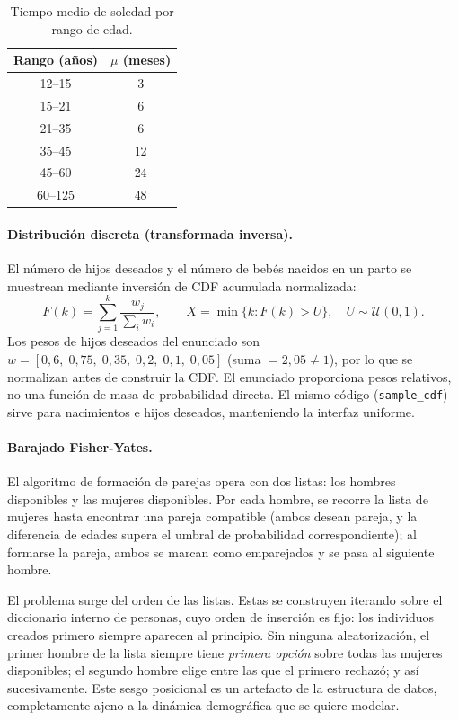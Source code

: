 \documentclass{llncs}
\begin{document}
\begin{table}[H]
\caption{Tiempo medio de soledad por rango de edad.}
\label{tab:soledad}
\centering
\begin{tabular}{cc}
\toprule
\textbf{Rango (años)} & \textbf{$\mu$ (meses)} \\
\midrule
12--15  & 3  \\
15--21  & 6  \\
21--35  & 6  \\
35--45  & 12 \\
45--60  & 24 \\
60--125 & 48 \\
\bottomrule
\end{tabular}
\end{table}

\paragraph{Distribución discreta (transformada inversa).}
El número de hijos deseados y el número de bebés nacidos en un parto se
muestrean mediante inversión de CDF acumulada normalizada:
\[
  F(k) = \sum_{j=1}^{k} \frac{w_j}{\sum_i w_i}, \qquad
  X = \min\bigl\{k : F(k) > U\bigr\}, \quad U \sim \mathcal{U}(0,1).
\]
Los pesos de hijos deseados del enunciado son
$w = [0{,}6,\; 0{,}75,\; 0{,}35,\; 0{,}2,\; 0{,}1,\; 0{,}05]$
(suma $= 2{,}05 \neq 1$), por lo que se normalizan antes de construir la
CDF\@.
El enunciado proporciona pesos relativos, no una función de masa de
probabilidad directa.
El mismo código (\texttt{sample\_cdf}) sirve para nacimientos e hijos
deseados, manteniendo la interfaz uniforme.

\paragraph{Barajado Fisher-Yates.}
El algoritmo de formación de parejas opera con dos listas: los hombres
disponibles y las mujeres disponibles.
Por cada hombre, se recorre la lista de mujeres hasta encontrar una pareja
compatible (ambos desean pareja, y la diferencia de edades supera el umbral
de probabilidad correspondiente); al formarse la pareja, ambos se marcan como
emparejados y se pasa al siguiente hombre.

El problema surge del orden de las listas.
Estas se construyen iterando sobre el diccionario interno de personas, cuyo
orden de inserción es fijo: los individuos creados primero siempre aparecen al
principio.
Sin ninguna aleatorización, el primer hombre de la lista siempre tiene
\emph{primera opción} sobre todas las mujeres disponibles; el segundo hombre
elige entre las que el primero rechazó; y así sucesivamente.
Este sesgo posicional es un artefacto de la estructura de datos, completamente
ajeno a la dinámica demográfica que se quiere modelar.
\end{document}
